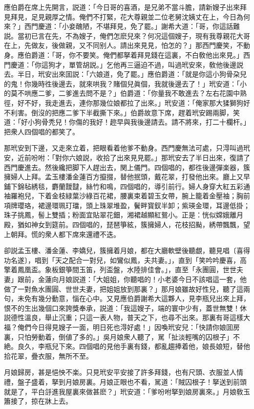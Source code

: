 應伯爵在席上先開言，説道：「今日哥的喜酒，是兄弟不當斗膽，請新嫂子出來拜見拜見，足見親厚之情。俺們不打緊，花大尊親並二位老舅沈姨丈在上，今日為何來？」西門慶道：「小妾醜陋，不堪拜見，免了罷。」謝希大道：「哥，你這話難説。當初已言在先，不為嫂子，俺們怎麽兒來？何况這個嫂子，現有我尊親花大哥在上，先做友，後做親，又不同别人。請出來見見，怕怎的？」那西門慶笑，不動身。應伯爵道：「哥，你不要笑。俺們都拏着拜見錢在這裏，不白敎他出來見。」西門慶道：「你這狗才，單管胡説。」乞他再三逼迫不過，叫過玳安來，敎他後邊説去。半日，玳安出來囬説：「六娘道，免了罷。」應伯爵道：「就是你這小狗骨朶兒的鬼！你幾時徃後邊去，就來哄我？賭個兒眞個，我就後邊去了！」玳安道：「小的莫不哄應二爹，二爹進去問不是？」伯爵道：「你量我不敢進去？左右花園中熟徑，好不好，我走進去，連你那幾位娘都拉了出來。」玳安道：「俺家那大猱獅狗好不利害。倒沒的把應二爹下半截撕下來。」伯爵故意下席，趕着玳安踢兩脚，笑道：「好小狗骨秃兒！你傷的我好！趂早與我後邊請去。請不將來，打二十欄杆。」把衆人四個唱的都笑了。

那玳安到下邊，又走來立着，把眼看着他爹不動身。西門慶無法可處，只淂叫過玳安，近前吩咐：「對你六娘説，收拾了出來見見罷。」那玳安去了半日出來，復請了西門慶進去。然後纔把脚下人趕出去，関上儀門。四個唱的，都徃後邊彈楽器，簇擁婦人上拜。孟玉樓潘金蓮百方攛掇，替他抿頭，戴花翠，打發他出來。廳上又早鋪下錦毡綉毯，麝蘭靉靆，絲竹和鳴，四個唱的，導引前行。婦人身穿大紅五彩通袖羅袍兒，下着金枝緑葉沙綠百花裙，腰裏束着碧玉女帶，腕上籠着金壓袖；胸前項牌瓔珞，裙邊環珮玎璫，頭上珠翠堆盈，鬢畔寳釵半卸；紫瑛金環，耳邊低掛；珠子挑鳳，髻上雙插；粉面宜貼翠花鈿，湘裙越顯紅鴛小。正是：恍似嫦娥離月殿，猶如神女到筵前。四個唱的，琵琶箏絃，簇擁婦人，花枝招颭，綉帶飄飄，望上朝拜。慌的衆人都下席來還禮不迭。

卻説孟玉樓、潘金蓮、李嬌兒，簇擁着月娘，都在大廳軟壁後聽覷，聽見唱〔喜得功名遂〕，唱到「天之配合一對兒，如鸞似鳳，夫共妻。」，直到「笑吟吟慶喜，高擎着鳳凰盃。象板銀箏間玉笛，列盃盤，水陸排佳會。」，直至「永團圓，世世夫妻」跟前，金蓮向月娘説道：「大姐姐，你聽唱的！小老婆今日不該唱這一套，他做了一對魚水團圓、世世夫妻，把姐姐放到那裏？」那月娘雖故好性兒，聽了這兩句，未免有幾分動意，惱在心中。又見應伯爵謝希大這夥人，見李瓶兒出來上拜，恨不的生出幾個口來誇獎奉承，説道：「我這嫂子，端的寰中少有，蓋世無雙！休説德性溫良，舉止沉重；只這一表人物，普天之下，也尋不出來。那裏有哥這樣大福？俺們今日得見嫂子一面，明日死也淂好處！」因喚玳安兒：「快請你娘囬房裏，只怕勞動着，倒値了多的。」吳月娘衆人聽了，駡「扯淡輕嘴的囚根子」不絶。良久，李瓶兒下來。四個唱的見他手裏有錢，都亂趨捧着他，娘長娘短，替他拾花翠，疊衣服，無所不至。

月娘歸房，甚是悒怏不楽。只見玳安平安接了許多拜錢，也有尺頭、衣服並人情禮，盤子盛着，拏到月娘房裏。月娘正眼也不看，駡道：「賊囚根子！拏送到前頭就是了，平白㧱進我屋裏來做甚麽？」玳安道：「爹吩咐拏到娘房裏來。」月娘敎玉簫接了，掠在牀上去。

